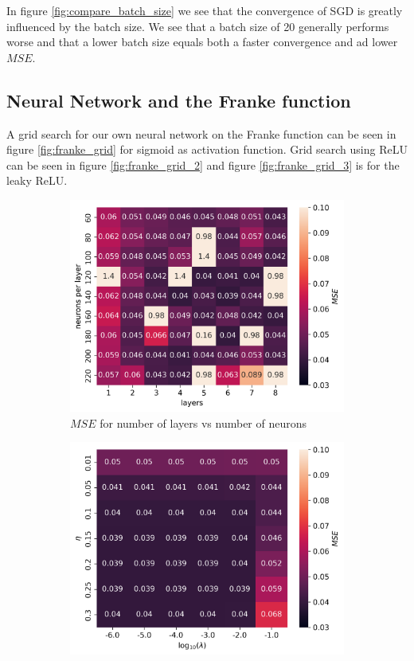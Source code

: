 \documentclass[11pt]{article}
\begin{document}
In figure \ref{fig:compare_batch_size} we see that the convergence of SGD is greatly influenced by the batch size. We see that a batch size of 20 generally performs worse and that a lower batch size equals both a faster convergence and ad lower $MSE$.

\subsection{Neural Network and the Franke function}
A grid search for our own neural network on the Franke function can be seen in figure \ref{fig:franke_grid} for sigmoid as activation function. Grid search using ReLU can be seen in figure \ref{fig:franke_grid_2} and figure \ref{fig:franke_grid_3} is for the leaky ReLU.
\begin{figure}[H]
    \begin{subfigure}{.5\textwidth}
        \centering
        \includegraphics[width=\textwidth]{../figures/franke_L_n_test_sigmoid.png}
        \caption{$MSE$ for number of layers vs number of neurons}
        \label{fig:}
    \end{subfigure}
    \begin{subfigure}{.5\textwidth}
        \centering
        \includegraphics[width=\textwidth]{../figures/franke_eta_lmb_sigmoid.png}

\end{subfigure}
\end{figure}
\end{document}
